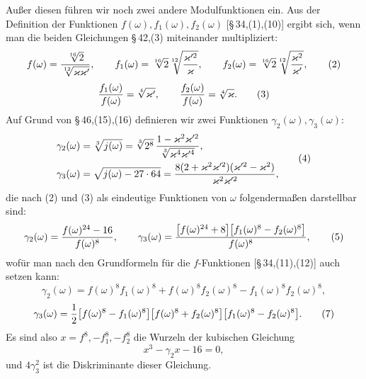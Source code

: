 \documentclass[11pt]{article}
\begin{document}
Außer diesen führen wir noch zwei andere Modulfunktionen ein. Aus der Definition der Funktionen $f(\omega),f_1(\omega),f_2(\omega)$ [\S\,34,(1),(10)] ergibt sich, wenn man die beiden Gleichungen \S\,42,(3) miteinander multipliziert:
\begin{equation}
f(\omega)={\sqrt[16]{2}\over\sqrt[12]{\varkappa\varkappa'}},
\qquad
f_1(\omega)=\sqrt[16]{2}\sqrt[12]{\varkappa'^2\over\varkappa},
\qquad
f_2(\omega)=\sqrt[16]{2}\sqrt[12]{\varkappa^2\over\varkappa'},
\tag{2}
\end{equation}
\begin{equation}
{f_1(\omega)\over f(\omega)}=\sqrt[4]{\varkappa'},
\qquad
{f_2(\omega)\over f(\omega)}=\sqrt[4]{\varkappa}.
\tag{3}
\end{equation}
Auf Grund von \S\,46,(15),(16) definieren wir zwei Funktionen $\gamma_2(\omega),\gamma_3(\omega)$:
\begin{equation}
\begin{aligned}
\gamma_2(\omega)&=\sqrt[3]{j(\omega)}
=\sqrt[3]{2^8}\,{1-\varkappa^2\varkappa'^2\over\sqrt[3]{\varkappa^4\varkappa'^4}},\\
\gamma_3(\omega)&=\sqrt{j(\omega)-27\cdot64}
={8(2+\varkappa^2\varkappa'^2)(\varkappa'^2-\varkappa^2)\over\varkappa^2\varkappa'^2},
\end{aligned}
\tag{4}
\end{equation}
die nach (2) und (3) als eindeutige Funktionen von $\omega$ folgendermaßen darstellbar sind:
\begin{equation}
\gamma_2(\omega)={f(\omega)^{24}-16\over f(\omega)^8},
\qquad
\gamma_3(\omega)={\bigl[f(\omega)^{24}+8\bigr]\bigl[f_1(\omega)^8-f_2(\omega)^8\bigr]\over f(\omega)^8},
\tag{5}
\end{equation}
wofür man nach den Grundformeln für die $f$-Funktionen [\S\,34,(11),(12)] auch setzen kann:
\begin{equation}
\gamma_2(\omega)=f(\omega)^8f_1(\omega)^8+f(\omega)^8f_2(\omega)^8-f_1(\omega)^8f_2(\omega)^8,
\tag{6}
\end{equation}
\begin{equation}
\gamma_3(\omega)={1\over2}\bigl[f(\omega)^8-f_1(\omega)^8\bigr]
\bigl[f(\omega)^8+f_2(\omega)^8\bigr]
\bigl[f_1(\omega)^8-f_2(\omega)^8\bigr].
\tag{7}
\end{equation}
Es sind also $x=f^8,-f_1^8,-f_2^8$ die Wurzeln der kubischen Gleichung
\begin{equation}
x^3-\gamma_2x-16=0,
\tag{8}
\end{equation}
und $4\gamma_3^2$ ist die Diskriminante dieser Gleichung.
\end{document}
